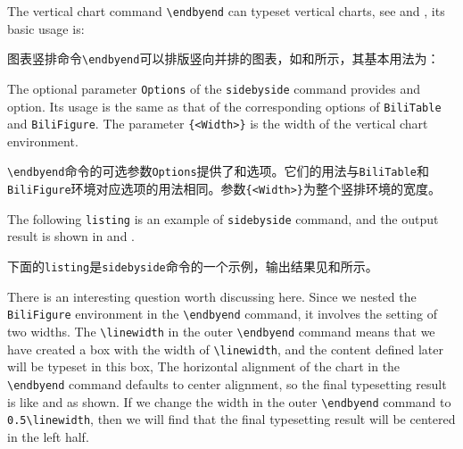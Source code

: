 \begin{ParaColumn}
    The vertical chart command \verb"\endbyend" can typeset vertical charts, see  and , its basic usage is:

    \switchcolumn

    图表竖排命令\verb"\endbyend"可以排版竖向并排的图表，如和所示，其基本用法为：

    \CrossColumnText{
        
        
    }
    \switchcolumn*

    The optional parameter \verb"Options" of the \verb"sidebyside" command provides  and  option.  Its usage is the same as that of the corresponding options of \verb"BiliTable" and \verb"BiliFigure". The parameter \verb"{<Width>}" is the width of the vertical chart environment.

    \switchcolumn

    \verb"\endbyend"命令的可选参数\verb"Options"提供了和选项。它们的用法与\verb"BiliTable"和\verb"BiliFigure"环境对应选项的用法相同。参数\verb"{<Width>}"为整个竖排环境的宽度。

    \switchcolumn*

    The following \verb"listing" is an example of \verb"sidebyside" command, and the output result is shown in  and .

    \switchcolumn

    下面的\verb"listing"是\verb"sidebyside"命令的一个示例，输出结果见和所示。

    \CrossColumnText{
        
    }
    \switchcolumn*

    There is an interesting question worth discussing here.  Since we nested the \verb"BiliFigure" environment in the \verb"\endbyend" command, it involves the setting of two widths.  The \verb"\linewidth" in the outer \verb"\endbyend" command means that we have created a box with the width of \verb"\linewidth", and the content defined later will be typeset in this box, The horizontal alignment of the chart in the \verb"\endbyend"  command defaults to center alignment, so the final typesetting result is like  and  as shown.  If we change the width in the outer \verb"\endbyend" command to \verb"0.5\linewidth", then we will find that the final typesetting result will be centered in the left half.


\end{ParaColumn}
